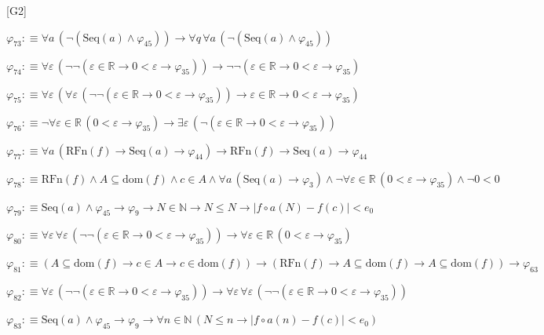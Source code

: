 \begin{fullproof}{[G2]}
\begin{abbrevlist}
\item $\varphi_{73} :\equiv \forall a\,(\neg (\mathrm{Seq}(a) \land \varphi_{45})) \to \forall q\,\forall a\,(\neg (\mathrm{Seq}(a) \land \varphi_{45}))$
\item $\varphi_{74} :\equiv \forall \varepsilon\,(\neg \neg (\varepsilon \in \mathbb{R} \to 0 < \varepsilon \to \varphi_{35})) \to \neg \neg (\varepsilon \in \mathbb{R} \to 0 < \varepsilon \to \varphi_{35})$
\item $\varphi_{75} :\equiv \forall \varepsilon\,(\forall \varepsilon\,(\neg \neg (\varepsilon \in \mathbb{R} \to 0 < \varepsilon \to \varphi_{35})) \to \varepsilon \in \mathbb{R} \to 0 < \varepsilon \to \varphi_{35})$
\item $\varphi_{76} :\equiv \neg \forall \varepsilon \in \mathbb{R}\,(0 < \varepsilon \to \varphi_{35}) \to \exists \varepsilon\,(\neg (\varepsilon \in \mathbb{R} \to 0 < \varepsilon \to \varphi_{35}))$
\item $\varphi_{77} :\equiv \forall a\,(\mathrm{RFn}(f) \to \mathrm{Seq}(a) \to \varphi_{44}) \to \mathrm{RFn}(f) \to \mathrm{Seq}(a) \to \varphi_{44}$
\item $\varphi_{78} :\equiv \mathrm{RFn}(f) \land A \subseteq \mathrm{dom}(f) \land c \in A \land \forall a\,(\mathrm{Seq}(a) \to \varphi_{3}) \land \neg \forall \varepsilon \in \mathbb{R}\,(0 < \varepsilon \to \varphi_{35}) \land \neg 0 < 0$
\item $\varphi_{79} :\equiv \mathrm{Seq}(a) \land \varphi_{45} \to \varphi_{9} \to N \in \mathbb{N} \to N \leq N \to \lvert f \circ a(N) - f(c) \rvert < e_{0}$
\item $\varphi_{80} :\equiv \forall \varepsilon\,\forall \varepsilon\,(\neg \neg (\varepsilon \in \mathbb{R} \to 0 < \varepsilon \to \varphi_{35})) \to \forall \varepsilon \in \mathbb{R}\,(0 < \varepsilon \to \varphi_{35})$
\item $\varphi_{81} :\equiv (A \subseteq \mathrm{dom}(f) \to c \in A \to c \in \mathrm{dom}(f)) \to (\mathrm{RFn}(f) \to A \subseteq \mathrm{dom}(f) \to A \subseteq \mathrm{dom}(f)) \to \varphi_{63}$
\item $\varphi_{82} :\equiv \forall \varepsilon\,(\neg \neg (\varepsilon \in \mathbb{R} \to 0 < \varepsilon \to \varphi_{35})) \to \forall \varepsilon\,\forall \varepsilon\,(\neg \neg (\varepsilon \in \mathbb{R} \to 0 < \varepsilon \to \varphi_{35}))$
\item $\varphi_{83} :\equiv \mathrm{Seq}(a) \land \varphi_{45} \to \varphi_{9} \to \forall n \in \mathbb{N}\,(N \leq n \to \lvert f \circ a(n) - f(c) \rvert < e_{0})$

\end{abbrevlist}
\end{fullproof}
